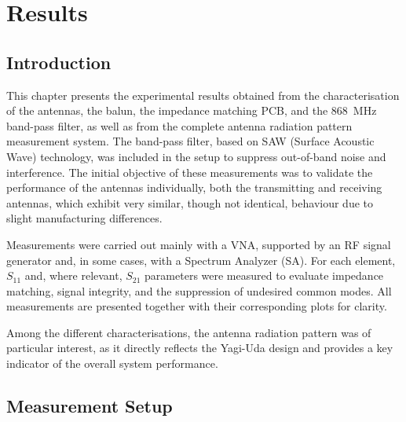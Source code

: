 \chapter{Results}
\label{cap:resultados_obtidos}

\section{Introduction}

This chapter presents the experimental results obtained from the characterisation of the antennas, the balun, the impedance matching PCB, and the 868~MHz band-pass filter, as well as from the complete antenna radiation pattern measurement system. The band-pass filter, based on SAW (Surface Acoustic Wave) technology, was included in the setup to suppress out-of-band noise and interference. The initial objective of these measurements was to validate the performance of the antennas individually, both the transmitting and receiving antennas, which exhibit very similar, though not identical, behaviour due to slight manufacturing differences.

Measurements were carried out mainly with a VNA, supported by an RF signal generator and, in some cases, with a Spectrum Analyzer (SA). For each element, $S_{11}$ and, where relevant, $S_{21}$ parameters were measured to evaluate impedance matching, signal integrity, and the suppression of undesired common modes. All measurements are presented together with their corresponding plots for clarity.

Among the different characterisations, the antenna radiation pattern was of particular interest, as it directly reflects the Yagi-Uda design and provides a key indicator of the overall system performance.


\section{Measurement Setup}

